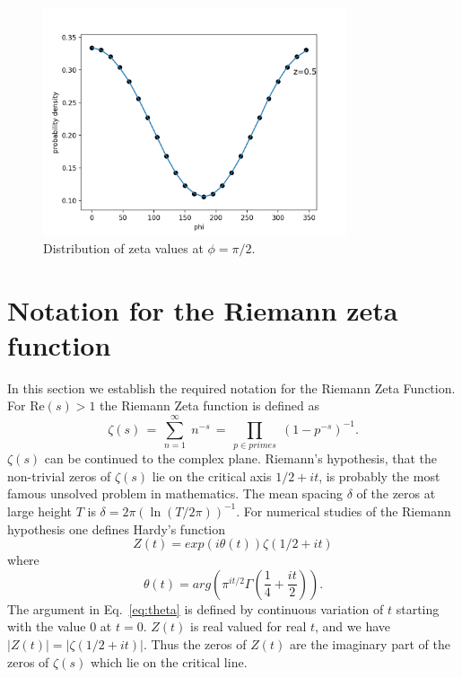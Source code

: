 \documentclass[twoside]{article}
\begin{document}
\begin{figure}
\centering
\includegraphics[width=0.8\textwidth]{z05.png}
\caption[]{ 
 Distribution of zeta values at $\phi = \pi/2$.
  }
\vspace{1mm}
\label{pi2}
\end{figure}

\section{\label{sec2}Notation for the Riemann zeta function}

In this section we  establish the required notation for the 
Riemann Zeta Function. 
For $\mathrm{Re} (s) > 1$ the Riemann Zeta function is defined as
\begin{equation}
\zeta ( s ) \, = \, \sum^{\infty}_{n = 1} \; n^{-s} \, = \, \prod_{p \in primes} \;
\left( 1 - p^{-s} \right)^{-1}.
\label{eqRie}
\end{equation}
 $\zeta ( s )$ can be continued to
the complex plane. Riemann's hypothesis, that the non-trivial zeros of $\zeta ( s )$ lie on the 
critical axis $1/2+it$, is probably the most famous unsolved problem in mathematics.
The mean spacing $\delta$ of the zeros  at large height $T$ is $\delta = 2\pi(\ln (T/2\pi))^{-1}$. 
For numerical studies of the Riemann hypothesis one defines Hardy's function
\begin{equation}
Z(t)=exp(i\theta(t))\zeta(1/2 +it) 
\label{eq:hardy}
\end{equation}
where 
\begin{equation}
\theta(t) = arg (\pi^{it/2} \Gamma(\frac{1}{4} + \frac{it}{2})). 
\label{eq:theta}
\end{equation}
The argument in Eq.~\ref{eq:theta} is defined by continuous variation of $t$ starting with the value $0$ at $t = 0$.
$Z(t)$ is real valued for real $t$,
and we have $|Z(t)| = |\zeta(1/2+it)|$. Thus the zeros of $Z(t)$ are the imaginary part of the zeros 
of $\zeta(s)$ which lie on the critical line.  
\end{document}
